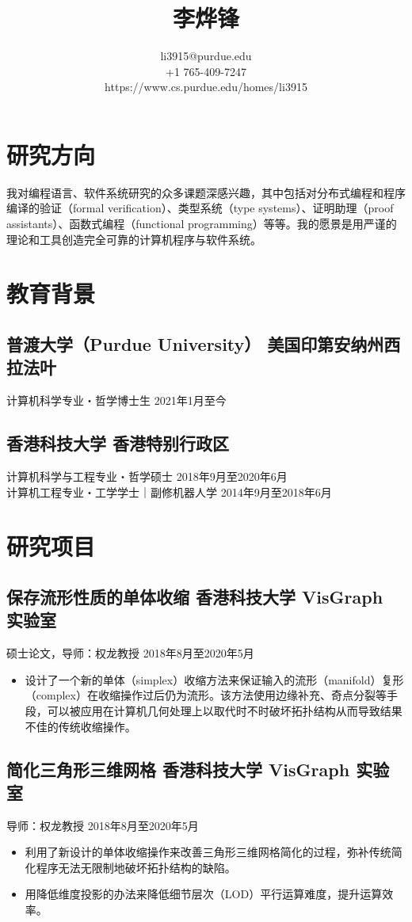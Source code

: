 \documentclass{article}
\title{\bfseries 李烨锋}
\author{
  \normalsize\sffamily li3915@purdue.edu \\
  \normalsize\sffamily +1 765-409-7247 \\
  \normalsize\sffamily https://www.cs.purdue.edu/homes/li3915}
\newcommand{\subsec}[2]{\subsection*{#1 \hfill {\normalfont\sffamily\kaishu #2}}}
\newcommand{\subsecdesc}[2]{{#1 \hfill\sffamily\kaishu #2}}
\begin{document}
\maketitle

\section*{研究方向} %

  我对编程语言、软件系统研究的众多课题深感兴趣，其中包括对分布式编程和程序编译的验证（formal verification）、类型系统（type systems）、证明助理（proof assistants）、函数式编程（functional programming）等等。我的愿景是用严谨的理论和工具创造完全可靠的计算机程序与软件系统。

\section*{教育背景} %

  \subsec{普渡大学（Purdue University）}{美国印第安纳州西拉法叶}
  \subsecdesc{计算机科学专业・哲学博士生}{2021年1月至今}

  \subsec{香港科技大学}{香港特别行政区}
  \subsecdesc{计算机科学与工程专业・哲学硕士}{2018年9月至2020年6月} \\
  \subsecdesc{计算机工程专业・工学学士｜副修机器人学}{2014年9月至2018年6月}

\section*{研究项目} %

  \subsec{保存流形性质的单体收缩}{香港科技大学 VisGraph 实验室}
  \subsecdesc{硕士论文，导师：权龙教授}{2018年8月至2020年5月}
  \begin{itemize}
    \item 设计了一个新的单体（simplex）收缩方法来保证输入的流形（manifold）复形（complex）在收缩操作过后仍为流形。该方法使用边缘补充、奇点分裂等手段，可以被应用在计算机几何处理上以取代时不时破坏拓扑结构从而导致结果不佳的传统收缩操作。
  \end{itemize}

  \subsec{简化三角形三维网格}{香港科技大学 VisGraph 实验室}
  \subsecdesc{导师：权龙教授}{2018年8月至2020年5月}
  \begin{itemize}
    \item 利用了新设计的单体收缩操作来改善三角形三维网格简化的过程，弥补传统简化程序无法无限制地破坏拓扑结构的缺陷。
    \item 用降低维度投影的办法来降低细节层次（LOD）平行运算难度，提升运算效率。
  \end{itemize}
\end{document}
